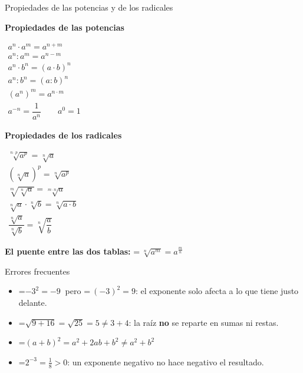 \documentclass[11pt,a4paper]{article}
\newcommand{\fmm}[1]{\setbox0=\hbox{$#1$}\ifdim\wd0>\linewidth\fmdisp{#1}\else\mbox{\box0}\fi}
\newcommand{\fmdisp}[1]{\[\setbox2=\hbox{$\displaystyle #1$}\ifdim\wd2>\linewidth\resizebox{\linewidth}{!}{\box2}\else\box2\fi\]}
\newcommand{\fmuline}[1]{\textbf{\color{fmaccent}#1}}
\begin{document}
\begin{fmdef}{Propiedades de las potencias y de los radicales}
\par\noindent \begin{minipage}[t]{0.48\linewidth}\vspace{0pt}\centering\textbf{Propiedades de las potencias}
\par $\displaystyle \begin{array}{l} a^n\cdot a^m=a^{n+m}\\[0pt] a^n : a^m=a^{n-m}\\[0pt] a^n\cdot b^n=(a\cdot b)^n\\[0pt] a^n : b^n=(a:b)^n\\[0pt] (a^n)^m=a^{n\cdot m}\\[0pt] a^{-n}=\dfrac{1}{a^n}\qquad a^0=1\end{array}$\par
\end{minipage}\hfill\begin{minipage}[t]{0.48\linewidth}\vspace{0pt}\centering\textbf{Propiedades de los radicales}
\par $\displaystyle \begin{array}{l} \sqrt[n\cdot p]{a^{p}}=\sqrt[n]{a}\\[0pt] \left(\sqrt[n]{a}\right)^p=\sqrt[n]{a^p}\\[0pt] \sqrt[m]{\sqrt[n]{a}}=\sqrt[m\cdot n]{a}\\[0pt] \sqrt[n]{a}\cdot\sqrt[n]{b}=\sqrt[n]{a\cdot b}\\[0pt] \dfrac{\sqrt[n]{a}}{\sqrt[n]{b}}=\sqrt[n]{\dfrac ab}\end{array}$\par
\end{minipage}\par
\begin{fmnote}[before skip=4pt,after skip=0pt,top=0.5mm,bottom=0.5mm]\fmuline{El puente entre las dos tablas:} \fmm{\ \sqrt[n]{a^m}=a^{\frac mn}}\end{fmnote}
\end{fmdef}

\begin{fmprop}{Errores frecuentes}
\begin{itemize}
\item \fmm{-3^2=-9\ } pero \fmm{\ (-3)^2=9}: el exponente solo afecta a lo que tiene justo delante.
\item \fmm{\sqrt{9+16}=\sqrt{25}=5\neq3+4}: la raíz \textbf{no} se reparte en sumas ni restas.
\item \fmm{(a+b)^2=a^2+2ab+b^2\neq a^2+b^2}
\item \fmm{2^{-3}=\frac18\gt0}: un exponente negativo no hace negativo el resultado.
\end{itemize}
\end{fmprop}
\end{document}
